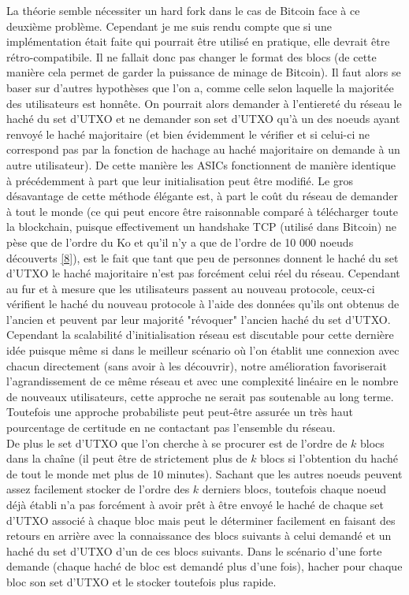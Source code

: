 \documentclass[12pt,a4paper]{article}
\newcommand{\source}[1]{\hyperlink{#1}{[#1]}}
\begin{document}
	La théorie semble nécessiter un hard fork dans le cas de Bitcoin face à ce deuxième problème. Cependant je me suis rendu compte que si une implémentation était faite qui pourrait être utilisé en pratique, elle devrait être rétro-compatibile. Il ne fallait donc pas changer le format des blocs (de cette manière cela permet de garder la puissance de minage de Bitcoin). Il faut alors se baser sur d'autres hypothèses que l'on a, comme celle selon laquelle la majoritée des utilisateurs est honnête. On pourrait alors demander à l'entiereté du réseau le haché du set d'UTXO et ne demander son set d'UTXO qu'à un des noeuds ayant renvoyé le haché majoritaire (et bien évidemment le vérifier et si celui-ci ne correspond pas par la fonction de hachage au haché majoritaire on demande à un autre utilisateur). De cette manière les ASICs fonctionnent de manière identique à précédemment à part que leur initialisation peut être modifié. Le gros désavantage de cette méthode élégante est, à part le coût du réseau de demander à tout le monde (ce qui peut encore être raisonnable comparé à télécharger toute la blockchain, puisque effectivement un handshake TCP (utilisé dans Bitcoin) ne pèse que de l'ordre du Ko et qu'il n'y a que de l'ordre de 10 000 noeuds découverts \source{8}), est le fait que tant que peu de personnes donnent le haché du set d'UTXO le haché majoritaire n'est pas forcément celui réel du réseau. Cependant au fur et à mesure que les utilisateurs passent au nouveau protocole, ceux-ci vérifient le haché du nouveau protocole à l'aide des données qu'ils ont obtenus de l'ancien et peuvent par leur majorité "révoquer" l'ancien haché du set d'UTXO.\\ %
	Cependant la scalabilité d'initialisation réseau est discutable pour cette dernière idée puisque même si dans le meilleur scénario où l'on établit une connexion avec chacun directement (sans avoir à les découvrir), notre amélioration favoriserait l'agrandissement de ce même réseau et avec une complexité linéaire en le nombre de nouveaux utilisateurs, cette approche ne serait pas soutenable au long terme. Toutefois une approche probabiliste peut peut-être assurée un très haut pourcentage de certitude en ne contactant pas l'ensemble du réseau.\\
De plus le set d'UTXO que l'on cherche à se procurer est de l'ordre de $k$ blocs dans la chaîne (il peut être de strictement plus de $k$ blocs si l'obtention du haché de tout le monde met plus de 10 minutes). Sachant que les autres noeuds peuvent assez facilement stocker de l'ordre des $k$ derniers blocs, toutefois chaque noeud déjà établi n'a pas forcément à avoir prêt à être envoyé le haché de chaque set d'UTXO associé à chaque bloc mais peut le déterminer facilement en faisant des retours en arrière avec la connaissance des blocs suivants à celui demandé et un haché du set d'UTXO d'un de ces blocs suivants. Dans le scénario d'une forte demande (chaque haché de bloc est demandé plus d'une fois), hacher pour chaque bloc son set d'UTXO et le stocker toutefois plus rapide.\\ %
\end{document}
